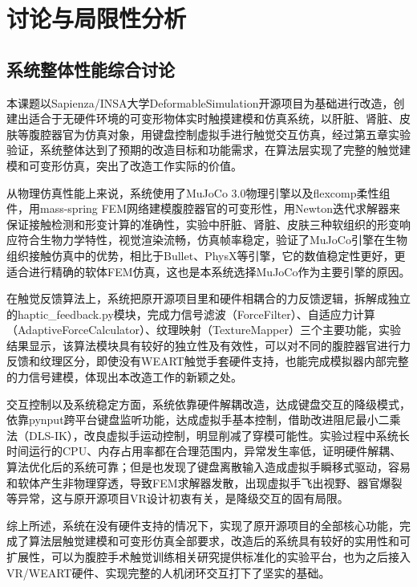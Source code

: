 
\chapter{讨论与局限性分析}

\section{系统整体性能综合讨论}

本课题以Sapienza/INSA大学DeformableSimulation开源项目为基础进行改造，创建出适合于无硬件环境的可变形物体实时触摸建模和仿真系统，以肝脏、肾脏、皮肤等腹腔器官为仿真对象，用键盘控制虚拟手进行触觉交互仿真，经过第五章实验验证，系统整体达到了预期的改造目标和功能需求，在算法层实现了完整的触觉建模和可变形仿真，突出了改造工作实际的价值。

从物理仿真性能上来说，系统使用了MuJoCo
3.0物理引擎以及flexcomp柔性组件，用mass-spring
FEM网络建模腹腔器官的可变形性，用Newton迭代求解器来保证接触检测和形变计算的准确性，实验中肝脏、肾脏、皮肤三种软组织的形变响应符合生物力学特性，视觉渲染流畅，仿真帧率稳定，验证了MuJoCo引擎在生物组织接触仿真中的优势，相比于Bullet、PhysX等引擎，它的数值稳定性更好，更适合进行精确的软体FEM仿真，这也是本系统选择MuJoCo作为主要引擎的原因。

在触觉反馈算法上，系统把原开源项目里和硬件相耦合的力反馈逻辑，拆解成独立的haptic\_feedback.py模块，完成力信号滤波（ForceFilter）、自适应力计算（AdaptiveForceCalculator）、纹理映射（TextureMapper）三个主要功能，实验结果显示，该算法模块具有较好的独立性及有效性，可以对不同的腹腔器官进行力反馈和纹理区分，即使没有WEART触觉手套硬件支持，也能完成模拟器内部完整的力信号建模，体现出本改造工作的新颖之处。

交互控制以及系统稳定方面，系统依靠硬件解耦改造，达成键盘交互的降级模式，依靠pynput跨平台键盘监听功能，达成虚拟手基本控制，借助改进阻尼最小二乘法（DLS-IK），改良虚拟手运动控制，明显削减了穿模可能性。实验过程中系统长时间运行的CPU、内存占用率都在合理范围内，异常发生率低，证明硬件解耦、算法优化后的系统可靠；但是也发现了键盘离散输入造成虚拟手瞬移式驱动，容易和软体产生非物理穿透，导致FEM求解器发散，出现虚拟手飞出视野、器官爆裂等异常，这与原开源项目VR设计初衷有关，是降级交互的固有局限。

综上所述，系统在没有硬件支持的情况下，实现了原开源项目的全部核心功能，完成了算法层触觉建模和可变形仿真全部要求，改造后的系统具有较好的实用性和可扩展性，可以为腹腔手术触觉训练相关研究提供标准化的实验平台，也为之后接入VR/WEART硬件、实现完整的人机闭环交互打下了坚实的基础。


